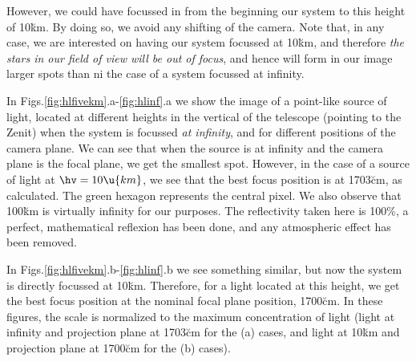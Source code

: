 However, we could have focussed in from the beginning our system to
this height of 10\u{km}. By doing so, we avoid any shifting of the
camera. Note that, in any case, we are interested on having our system
focussed at 10\u{km}, and therefore \emph{the stars in our field of
  view will be out of focus}, and hence will form in our image larger
spots than ni the case of a system focussed at infinity.

\colldeltafig

In Figs.\ref{fig:hlfivekm}.a-\ref{fig:hlinf}.a we show the image of a
point-like source of light, located at different heights \hv in the
vertical of the telescope (pointing to the Zenit) when the system is
focussed \emph{at infinity}, and for different positions of the camera
plane. We can see that when the source is at infinity and the camera
plane is the focal plane, we get the smallest spot. However, in the
case of a source of light at $\hv=10\u{km}$, we see that the best
focus position is at 1703\u{cm}, as calculated. The green hexagon
represents the central pixel. We also observe that 100\u{km} is
virtually infinity for our purposes. The reflectivity taken here is
100\%, a perfect, mathematical reflexion has been done, and any
atmospheric effect has been removed.











\hlfivekmfig
 
\hltenkmfig
 
\hltwelvekmfig
 
\hlhundredkmfig
 
\hlinffig

\Mspotsfig

\afterpage{\clearpage}

In Figs.\ref{fig:hlfivekm}.b-\ref{fig:hlinf}.b we see something
similar, but now the system is directly focussed at 10\u{km}.
Therefore, for a light located at this height, we get the best focus
position at the nominal focal plane position, 1700\u{cm}.  In these
figures, the scale is normalized to the maximum concentration of light
(light at infinity and projection plane at 1703\u{cm} for the (a)
cases, and light at 10\u{km} and projection plane at 1700\u{cm} for
the (b) cases).

